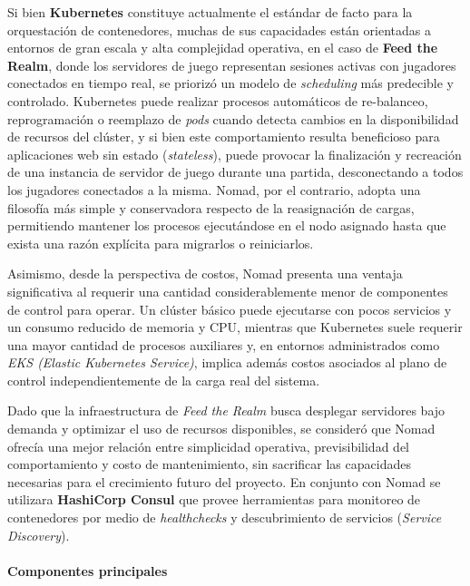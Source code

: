 Si bien \textbf{Kubernetes} constituye actualmente el estándar de facto para la orquestación de contenedores, muchas de sus capacidades están orientadas a entornos
de gran escala y alta complejidad operativa, en el caso de \textbf{Feed the Realm}, donde los servidores de juego representan sesiones activas con jugadores conectados
en tiempo real, se priorizó un modelo de \textit{scheduling} más predecible y controlado.
Kubernetes puede realizar procesos automáticos de re-balanceo, reprogramación o reemplazo de \textit{pods} cuando detecta cambios en la disponibilidad de recursos del clúster, y
si bien este comportamiento resulta beneficioso para aplicaciones web sin estado (\textit{stateless}), puede provocar la finalización y recreación 
de una instancia de servidor de juego durante una partida, desconectando a todos los jugadores conectados a la misma.
Nomad, por el contrario, adopta una filosofía más simple y conservadora respecto de la reasignación de cargas, permitiendo mantener los procesos ejecutándose 
en el nodo asignado hasta que exista una razón explícita para migrarlos o reiniciarlos.

Asimismo, desde la perspectiva de costos, Nomad presenta una ventaja significativa al requerir una cantidad considerablemente menor de componentes de control para operar.
Un clúster básico puede ejecutarse con pocos servicios y un consumo reducido de memoria y CPU, mientras que Kubernetes suele requerir una mayor cantidad de procesos 
auxiliares y, en entornos administrados como \textit{EKS (Elastic Kubernetes Service)}, implica además costos asociados al plano de control independientemente 
de la carga real del sistema.

Dado que la infraestructura de \textit{Feed the Realm} busca desplegar servidores bajo demanda y optimizar el uso de recursos disponibles,
se consideró que Nomad ofrecía una mejor relación entre simplicidad operativa, previsibilidad del comportamiento y costo de mantenimiento, sin sacrificar las capacidades 
necesarias para el crecimiento futuro del proyecto. En conjunto con Nomad se utilizara \textbf{HashiCorp Consul} que provee
herramientas para monitoreo de contenedores por medio de \textit{healthchecks} y descubrimiento de servicios (\textit{Service Discovery}).

\paragraph{Componentes principales}


